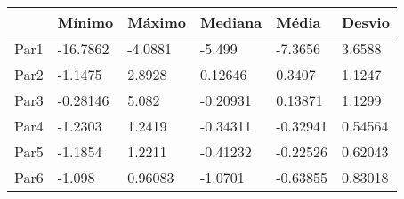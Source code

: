 \begin{tabular}{llllll}
& Mínimo & Máximo & Mediana & Média & Desvio \\ 
\hline 
Par1 & -16.7862 & -4.0881 & -5.499 & -7.3656 & 3.6588 \\ 
Par2 & -1.1475 & 2.8928 & 0.12646 & 0.3407 & 1.1247 \\ 
Par3 & -0.28146 & 5.082 & -0.20931 & 0.13871 & 1.1299 \\ 
Par4 & -1.2303 & 1.2419 & -0.34311 & -0.32941 & 0.54564 \\ 
Par5 & -1.1854 & 1.2211 & -0.41232 & -0.22526 & 0.62043 \\ 
Par6 & -1.098 & 0.96083 & -1.0701 & -0.63855 & 0.83018 \\ 
\hline 
\end{tabular}